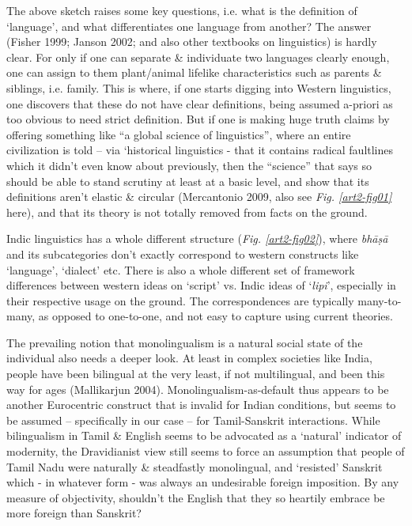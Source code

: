 The above sketch raises some key questions, i.e. what is the definition of ‘language’, and what differentiates one language from another? The answer (Fisher 1999; Janson 2002; and also other textbooks on linguistics) is hardly clear. For only if one can separate \& individuate two languages clearly enough, one can assign to them plant/animal lifelike characteristics such as parents \& siblings, i.e. family. This is where, if one starts digging into Western linguistics, one discovers that these do not have clear definitions, being assumed a-priori as too obvious to need strict definition. But if one is making huge truth claims by offering something like “a global science of linguistics”, where an entire civilization is told – via ‘historical linguistics - that it contains radical faultlines which it didn’t even know about previously, then the “science” that says so should be able to stand scrutiny at least at a basic level, and show that its definitions aren’t elastic \& circular (Mercantonio 2009, also see \textit{Fig. \ref{art2-fig01}} here), and that its theory is not totally removed from facts on the ground.

Indic linguistics has a whole different structure (\textit{Fig. \ref{art2-fig02}}), where \textit{bhāṣā} and its subcategories don’t exactly correspond to western constructs like ‘language’, ‘dialect’ etc. There is also a whole different set of framework differences between western ideas on ‘script’ vs. Indic ideas of ‘\textit{lipi}’, especially in their respective usage on the ground. The correspondences are typically many-to-many, as opposed to one-to-one, and not easy to capture using current theories.

The prevailing notion that monolingualism is a natural social state of the individual also needs a deeper look. At least in complex societies like India, people have been bilingual at the very least, if not multilingual, and been this way for ages (Mallikarjun 2004). Monolingualism-as-default thus appears to be another Eurocentric construct that is invalid for Indian conditions, but seems to be assumed – specifically in our case – for Tamil-Sanskrit interactions. While bilingualism in Tamil \& English seems to be advocated as a ‘natural’ indicator of modernity, the Dravidianist view still seems to force an assumption that people of Tamil Nadu were naturally \& steadfastly monolingual, and ‘resisted’ Sanskrit which - in whatever form - was always an undesirable foreign imposition. By any measure of objectivity, shouldn’t the English that they so heartily embrace be more foreign than Sanskrit?

